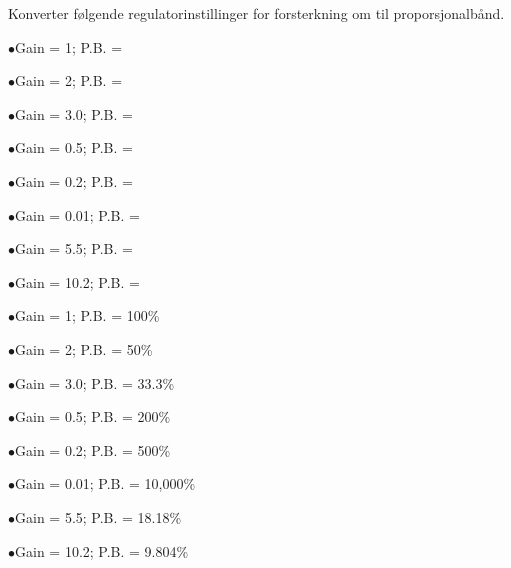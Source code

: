 


Konverter f{\o}lgende regulatorinstillinger for forsterkning om til proporsjonalb{\aa}nd. 

\medskip 
\item{$\bullet$}Gain = 1; P.B. = \underbar{\hskip 50pt}
\vskip 5pt
\item{$\bullet$}Gain = 2; P.B. = \underbar{\hskip 50pt} 
\vskip 5pt
\item{$\bullet$}Gain = 3.0; P.B. = \underbar{\hskip 50pt} 
\vskip 5pt
\item{$\bullet$}Gain = 0.5; P.B. = \underbar{\hskip 50pt}
\vskip 5pt
\item{$\bullet$}Gain = 0.2; P.B. = \underbar{\hskip 50pt} 
\vskip 5pt
\item{$\bullet$}Gain = 0.01; P.B. = \underbar{\hskip 50pt} 
\vskip 5pt
\item{$\bullet$}Gain = 5.5; P.B. = \underbar{\hskip 50pt} 
\vskip 5pt
\item{$\bullet$}Gain = 10.2; P.B. = \underbar{\hskip 50pt} 
\medskip 







\medskip 
\item{$\bullet$}Gain = 1; P.B. = 100\%
\vskip 5pt
\item{$\bullet$}Gain = 2; P.B. = 50\%
\vskip 5pt
\item{$\bullet$}Gain = 3.0; P.B. = 33.3\%
\vskip 5pt
\item{$\bullet$}Gain = 0.5; P.B. = 200\%
\vskip 5pt
\item{$\bullet$}Gain = 0.2; P.B. = 500\%
\vskip 5pt
\item{$\bullet$}Gain = 0.01; P.B. = 10,000\%
\vskip 5pt
\item{$\bullet$}Gain = 5.5; P.B. = 18.18\%
\vskip 5pt
\item{$\bullet$}Gain = 10.2; P.B. = 9.804\%
\medskip 












